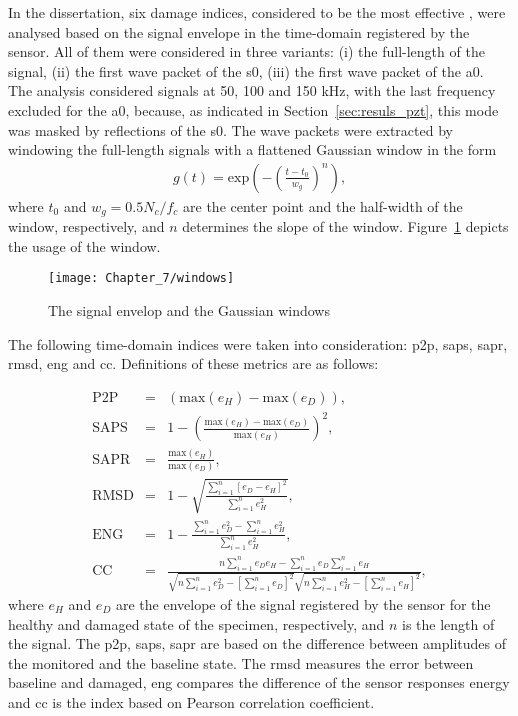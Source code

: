 \documentclass[11pt,a4paper,final]{report}
\theoremstyle{plain}
\begin{document}
In the dissertation, six damage indices, considered to be the most effective \cite{torkamani2014novel, moix2016damage}, were analysed based on the signal envelope in the time-domain registered by the sensor.
All of them were considered in three variants: (i) the full-length of the signal, (ii) the first wave packet of the \ac{s0}, (iii) the first wave packet of the \ac{a0}.
The analysis considered signals at 50, 100 and 150 \unit{\kHz}, with the last frequency excluded for the \ac{a0}, because, as indicated in Section~\ref{sec:resuls_pzt}, this mode was masked by reflections of the \ac{s0}.
The wave packets were extracted by windowing the full-length signals with a flattened Gaussian window in the form
\begin{eqnarray}
	g(t)= \mathrm{exp}\left(-\left(\frac{t-t_0}{w_g}\right) ^{n}\right),
	\label{eq:psi_g}
\end{eqnarray}
where \(t_0\) and \(w_g=0.5N_c/f_c\) are the center point and the half-width of the window, respectively, and \(n\) determines the slope of the window. Figure~\ref{fig:windows} depicts the usage of the window.
\begin{figure}[!tbh]
	\begin{center}
		\texttt{[image: Chapter\_7/windows]}
	\end{center}
	\caption{The signal envelop and the Gaussian windows}
	\label{fig:windows}
\end{figure}

The following time-domain indices were taken into consideration: \ac{p2p}, \ac{saps}, \ac{sapr}, \acf{rmsd}, \ac{eng} and \ac{cc}.
Definitions of these metrics are as follows:

\begin{eqnarray}
	\mathrm{P2P} & = & \left(\mathrm{max}(e_H) - \mathrm{max}(e_D)\right),\\
	\mathrm{SAPS} & = & 1 - \left(\frac{\mathrm{max}(e_H)-\mathrm{max}(e_D)}{\mathrm{max}(e_H)}\right)^2,\\
	\mathrm{SAPR} & = & \frac{\mathrm{max}(e_H)}{\mathrm{max}(e_D)},\\
	\mathrm{RMSD} & = & 1 - \sqrt{\frac{\sum_{i=1}^{n}\left[e_D-e_H\right]^2}	{\sum_{i=1}^{n}e_H^2}},\\
	\mathrm{ENG} & = & 1 -  \frac{\sum_{i=1}^{n}{e_D^2}-\sum_{i=1}^{n}{e_H^2}}{\sum_{i=1}^{n}{e_H^2}},\\
	\mathrm{CC} & = & \frac{n\sum_{i=1}^{n}e_De_H-\sum_{i=1}^{n}e_D\sum_{i=1}^{n}e_H}{\sqrt{n\sum_{i=1}^{n}e_D^2-\left[\sum_{i=1}^{n}e_D\right]^2}\sqrt{n\sum_{i=1}^{n}e_H^2-\left[\sum_{i=1}^{n}e_H\right]^2}},
\end{eqnarray}
where \(e_H\) and \(e_D\) are the envelope of the signal registered by the sensor for the healthy and damaged state of the specimen, respectively, and \(n\) is the length of the signal.
The \ac{p2p}, \ac{saps}, \ac{sapr} are based on the difference between amplitudes of the monitored and the baseline state.
The \ac{rmsd} measures the error between baseline and damaged, \ac{eng} compares the difference of the sensor responses energy and \ac{cc} is the index based on Pearson correlation coefficient.
\end{document}
